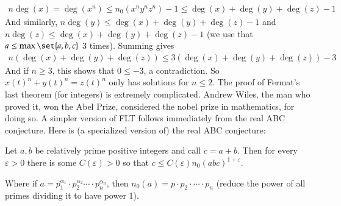 \documentclass[12pt]{article}
\newenvironment{theorem}{\begin{mytheorem}}{\end{mytheorem}}
\theoremstyle{definitionstyle}
\def \ve{\varepsilon}
\begin{document}
\begin{align*}
n\deg(x) = \deg(x^n) \leq n_0(x^ny^nz^n) - 1 \leq \deg(x)+\deg(y)+\deg(z) - 1
\end{align*}
And similarly, $n\deg(y) \leq \deg(x)+\deg(y)+\deg(z) - 1$ and $n\deg(z) \leq \deg(x)+\deg(y)+\deg(z) - 1$ (we use that $a \leq \max\set{a, b,c}$ 3 times). Summing gives
\begin{align*}
	n(\deg(x)+\deg(y)+\deg(z)) \leq 3(\deg(x)+\deg(y)+\deg(z)) - 3
\end{align*}
And if $n \geq 3$, this shows that $0 \leq -3$, a contradiction. So $x(t)^n + y(t)^n = z(t)^n$ only has solutions for $n \leq 2$. The proof of Fermat's last theorem (for integers) is extremely complicated. Andrew Wiles, the man who proved it, won the Abel Prize, considered the nobel prize in mathematics, for doing so. A simpler version of FLT follows immediately from the real ABC conjecture. Here is (a specialized version of) the real ABC conjecture:
\begin{theorem}
	Let $a, b$ be relatively prime positive integers and call $c = a + b$. Then for every $\ve > 0$ there is some $C(\ve) > 0$ so that $c \leq C(\ve) n_0(abc)^{1+\ve}$.
\end{theorem}
Where if $a = p_1^{\alpha_1} \cdot p_2^{\alpha_2} \cdots \cdot p_n^{\alpha_n}$, then $n_0(a) = p \cdot p_2 \cdot \cdots \cdot p_n$ (reduce the power of all primes dividing it to have power 1).
\end{document}
